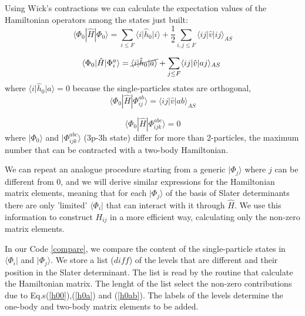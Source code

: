 \documentclass[twoside]{article}
\newcommand{\bra}[1]{\langle #1 |}
\newcommand{\ket}[1]{| #1 \rangle}
\begin{document}
Using Wick's contractions we can calculate the expectation values of the Hamiltonian operators among the states just built:
\begin{equation}\label{h00}
\bra{\Phi_0} \hat H \ket{\Phi_0} = \sum_{i \leq F} \langle i \vert \hat h_0 \vert i \rangle + \frac{1}{2} \sum_{i,j \leq F} \langle i j\vert \hat v \vert ij \rangle_{AS} 
\end{equation}

\begin{equation}\label{h0a}
\bra{\Phi_0} \hat H \ket{\Phi_i^a} =  \cancel{\langle i \vert \hat h_0 \vert a \rangle} +  \sum_{j \leq F} \langle i j\vert \hat v \vert aj \rangle_{AS} \; 
\end{equation}
where ${\langle i \vert \hat h_0 \vert a \rangle}=0$ because the single-particles states are orthogonal,
\begin{equation}\label{h0ab}
\bra{\Phi_0} \hat H \ket{\Phi_{ij}^{ab}} =  \langle i j\vert \hat v \vert ab \rangle_{AS}
\end{equation}

\begin{equation}
\bra{\Phi_0} \hat H \ket{\Phi_{ijk}^{abc}} = 0
\end{equation}
where $\ket{\Phi_0}$ and $\ket{\Phi_{ijk}^{abc}}$ (3p-3h state) differ for more than 2-particles, the maximum number that can be contracted with a two-body Hamiltonian.

We can repeat an analogue procedure starting from a generic $\ket{\Phi_j}$ where $j$ can be different from 0, and we will derive similar expressions for the Hamiltonian matrix elements, meaning that for each $\ket{\Phi_j}$ of the basis of Slater determinants there are only 'limited' $\bra{\Phi_i}$ that can interact with it through $\hat H$. 
We use this information to construct $H_{ij}$ in a more efficient way, calculating only the non-zero matrix elements.

In our Code \ref{compare}, we compare the content of the single-particle states in $\bra{\Phi_i}$ and $\ket{\Phi_j}$. We store a list ($diff$) of the levels that are different and their position in the Slater determinant. The list is read by the routine that calculate the Hamiltonian matrix. The lenght of the list select the non-zero contributions due to Eq.s(\ref{h00}),(\ref{h0a}) and (\ref{h0ab}). The labels of the levels determine the one-body and two-body matrix elements to be added. 
\end{document}
